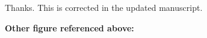 
Thanks. This is corrected in the updated manuscript.

\clearpage
\noindent\textbf{Other figure referenced above:}
\vspace{0.5em}

{\setcounter{figure}{3}\renewcommand{\thefigure}{\arabic{figure}}
}

\clearpage